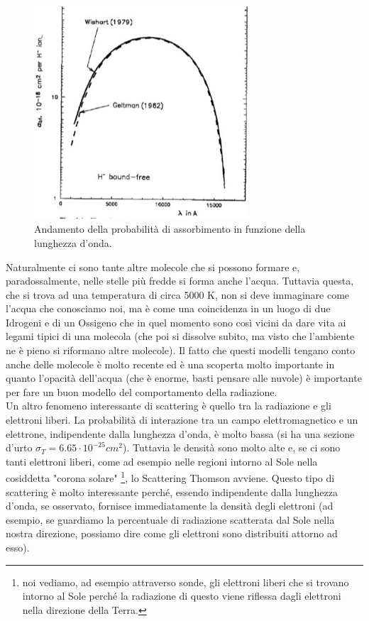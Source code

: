 \documentclass[a4paper,11pt]{article}
\begin{document}
\newpage
\begin{figure}[h!!]
        \centering
        \includegraphics[width=8cm]{Hcontinuo.jpg}
        \caption{Andamento della probabilità di assorbimento in funzione della lunghezza d'onda.}
        \label{fig:Hcontinuo}
    \end{figure}
Naturalmente ci sono tante altre molecole che si possono formare e, paradossalmente, nelle stelle più fredde si forma anche l'acqua. Tuttavia questa, che si trova ad una temperatura di circa 5000 K, non si deve immaginare come l'acqua che conosciamo noi, ma è come una coincidenza in un luogo di due Idrogeni e di un Ossigeno che in quel momento sono così vicini da dare vita ai legami tipici di una molecola (che poi si dissolve subito, ma visto che l'ambiente ne è pieno si riformano altre molecole). Il fatto che questi modelli tengano conto anche delle molecole è molto recente ed è una scoperta molto importante in quanto l'opacità dell'acqua (che è enorme, basti pensare alle nuvole) è importante per fare un buon modello del comportamento della radiazione.\\ Un altro fenomeno interessante di scattering è quello tra la radiazione e gli elettroni liberi. La probabilità di interazione tra un campo elettromagnetico e un elettrone, indipendente dalla lunghezza d'onda, è molto bassa (si ha una sezione d'urto \(\sigma_T= 6.65 \cdot 10^{-25} cm^2 \)). Tuttavia le densità sono molto alte e, se ci sono tanti elettroni liberi, come ad esempio nelle regioni intorno al Sole nella cosiddetta "corona solare" \footnote{noi vediamo, ad esempio attraverso sonde, gli elettroni liberi che si trovano intorno al Sole perché la radiazione di questo viene riflessa dagli elettroni nella direzione della Terra. }, lo Scattering Thomson avviene. Questo tipo di scattering è molto interessante perché, essendo indipendente dalla lunghezza d'onda, se osservato, fornisce immediatamente la densità degli elettroni (ad esempio, se guardiamo la percentuale di radiazione scatterata dal Sole nella nostra direzione, possiamo dire come gli elettroni sono distribuiti attorno ad esso). \\ 
\end{document}
